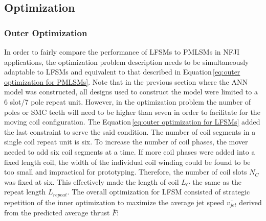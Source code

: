         
        \subsection{Optimization}                   \label{Chapter:RSM/LFSM/Optimization}
        
        
            \subsubsection{Outer Optimization}          \label{Chapter:RSM/LFSM/Optimization/Outer}
            
            
                In order to fairly compare the performance of \acsp{LFSM} to \acsp{PMLSM} in \acs{NFJI} applications, the optimization problem description needs to be simultaneously adaptable to \acsp{LFSM} and equivalent to that described in Equation\,\ref{eq:outer optimization for PMLSMs}. Note that in the previous section where the \acs{ANN} model was constructed, all designs used to construct the model were limited to a 6 slot/7 pole repeat unit. However, in the optimization problem the number of poles or \acs{SMC} teeth will need to be higher than seven in order to facilitate for the moving coil configuration. The Equation\,\ref{eq:outer optimization for LFSMs} added the last constraint to serve the said condition. The number of coil segments in a single coil repeat unit is six. To increase the number of coil phases, the mover needed to add six coil segments at a time. If more coil phases were added into a fixed length coil, the width of the individual coil winding could be found to be too small and impractical for prototyping. Therefore, the number of coil slots $N_C$ was fixed at six. This effectively made the length of coil $L_C$ the same as the repeat length $L_{repeat}$. The overall optimization for \acs{LFSM} consisted of strategic repetition of the inner optimization to maximize the average jet speed $\overline{v_{jet}}$ derived from the predicted average thrust $\overline{F}$:
                
